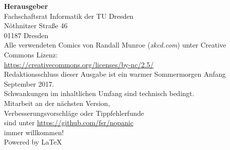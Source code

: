 \newpage
\thispagestyle{empty} %
\color{white}

\begin{minipage}[t][\textheight][b]{.60\textwidth}
\footnotesize
\textbf{Herausgeber} \\
Fachschaftsrat Informatik der TU Dresden\\
Nöthnitzer Straße 46\\
01187 Dresden\\[1\baselineskip]

Alle verwendeten Comics von Randall Munroe (\textit{xkcd.com}) unter Creative Commons Lizenz:\\
\url{https://creativecommons.org/licenses/by-nc/2.5/}\\[1\baselineskip]

Redaktionsschluss dieser Ausgabe ist ein warmer Sommermorgen Anfang September 2017.\\%
Schwankungen im inhaltlichen Umfang sind technisch bedingt.\\[1\baselineskip]

Mitarbeit an der nächsten Version,\\
Verbesserungsvorschläge oder Tippfehlerfunde\\
sind unter \url{https://github.com/fsr/nopanic}\\
immer willkommen!\\[1\baselineskip]

Powered by \LaTeX
\end{minipage}%
\hspace{.20\textwidth}%
